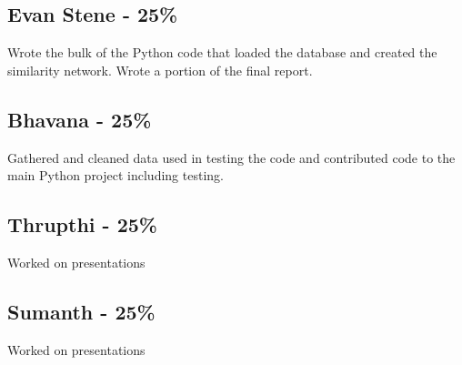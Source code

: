 \documentclass[12pt]{article}
\begin{document}
\subsection*{Evan Stene - 25\%}
\quad Wrote the bulk of the Python code that loaded the database and created the similarity network. Wrote a portion of the final report.
\subsection*{Bhavana - 25\%}
\quad Gathered and cleaned data used in testing the code and contributed code to the main Python project including testing.
\subsection*{Thrupthi - 25\%}
\quad Worked on presentations
\subsection*{Sumanth - 25\%}
\quad Worked on presentations


\end{document}
